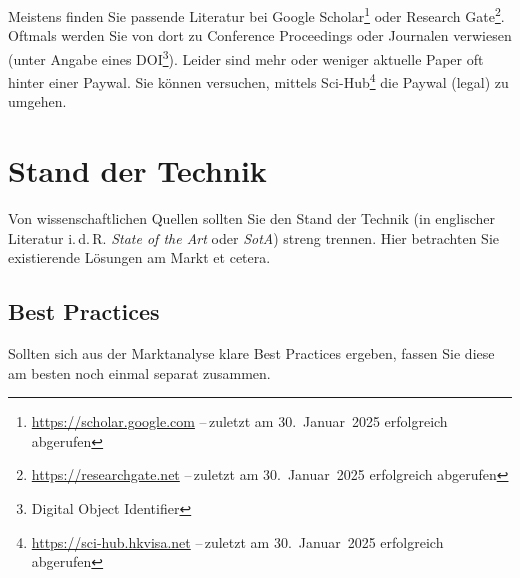 Meistens finden Sie passende Literatur bei Google Scholar\footnote{\url{https://scholar.google.com} --\,zuletzt am 30.~Januar~2025 erfolgreich abgerufen} oder Research Gate\footnote{\url{https://researchgate.net} --\,zuletzt am 30.~Januar~2025 erfolgreich abgerufen}. Oftmals werden Sie von dort zu Conference Proceedings oder Journalen verwiesen (unter Angabe eines DOI\footnote{Digital Object Identifier}). Leider sind mehr oder weniger aktuelle Paper oft hinter einer Paywal. Sie können versuchen, mittels Sci-Hub\footnote{\url{https://sci-hub.hkvisa.net} --\,zuletzt am 30.~Januar~2025 erfolgreich abgerufen} die Paywal (legal) zu umgehen.

\section{Stand der Technik}\label{sec:RelatedWork:SotA}
Von wissenschaftlichen Quellen sollten Sie den Stand der Technik (in englischer Literatur i.\,d.\,R. \emph{State of the Art} oder \emph{SotA}) streng trennen. Hier betrachten Sie existierende Lösungen am Markt et cetera.

\subsection{Best Practices}\label{subsec:RelatedWork:BestPractices}
Sollten sich aus der Marktanalyse klare Best Practices ergeben, fassen Sie diese am besten noch einmal separat zusammen.